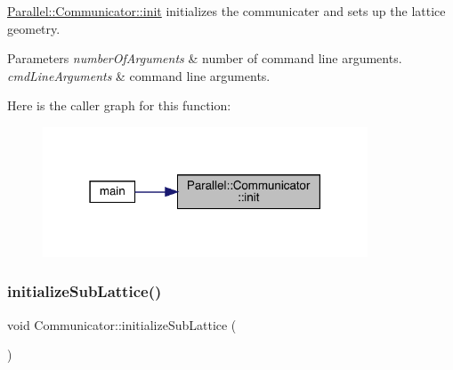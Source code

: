 \mbox{\hyperlink{class_parallel_1_1_communicator_a4ed2a77c33cd899b31131e44fc906fd7}{Parallel\+::\+Communicator\+::init}} initializes the communicater and sets up the lattice geometry. 


\begin{DoxyParams}{Parameters}
{\em number\+Of\+Arguments} & number of command line arguments. \\
\hline
{\em cmd\+Line\+Arguments} & command line arguments. \\
\hline
\end{DoxyParams}
Here is the caller graph for this function\+:
\nopagebreak
\begin{figure}[H]
\begin{center}
\leavevmode
\includegraphics[width=274pt]{class_parallel_1_1_communicator_a4ed2a77c33cd899b31131e44fc906fd7_icgraph}
\end{center}
\end{figure}
\mbox{\label{class_parallel_1_1_communicator_a3094d713d09225738ecf0250019db115}} 
\subsubsection{\texorpdfstring{initializeSubLattice()}{initializeSubLattice()}}
{\footnotesize\ttfamily void Communicator\+::initialize\+Sub\+Lattice (\begin{DoxyParamCaption}{ }\end{DoxyParamCaption})\hspace{0.3cm}{\ttfamily [static]}}


